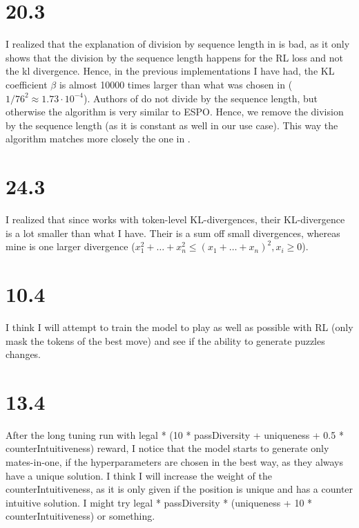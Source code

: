\documentclass[a4paper, 12pt]{article}
\begin{document}
\addtocounter{footnote}{-1}


\section{20.3}

I realized that the explanation of division by sequence length in \cite{ou2025principledrldiffusionllms} is bad, as it only shows that the division by the sequence length happens for the RL loss and not the kl divergence. Hence, in the previous implementations I have had, the KL coefficient $\beta$ is almost 10000 times larger than what was chosen in \cite{feng2025generatingcreativechesspuzzles} ($1 / 76^2\approx1.73\cdot 10^{-4}$). Authors of \cite{rojas2025improvingreasoningdiffusionlanguage} do not divide by the sequence length, but otherwise the algorithm is very similar to ESPO. Hence, we remove the division by the sequence length (as it is constant as well in our use case). This way the algorithm matches more closely the one in \cite{feng2025generatingcreativechesspuzzles}.


\section{24.3}

I realized that since \cite{feng2025generatingcreativechesspuzzles} works with token-level KL-divergences, their KL-divergence is a lot smaller than what I have. Their is a sum off small divergences, whereas mine is one larger divergence ($x_1 ^ 2  + \dots + x_n ^ 2 \leq (x_1 + \dots + x_n) ^ 2, x_i \geq 0$).

\section{10.4}

I think I will attempt to train the model to play as well as possible with RL (only mask the tokens of the best move) and see if the ability to generate puzzles changes.

\section{13.4}

After the long tuning run with legal * (10 * passDiversity + uniqueness + 0.5 * counterIntuitiveness) reward, I notice that the model starts to generate only mates-in-one, if the hyperparameters are chosen in the best way, as they always have a unique solution. I think I will increase the weight of the counterIntuitiveness, as it is only given if the position is unique and has a counter intuitive solution. I might try legal * passDiversity * (uniqueness + 10 * counterIntuitiveness) or something.
\end{document}

